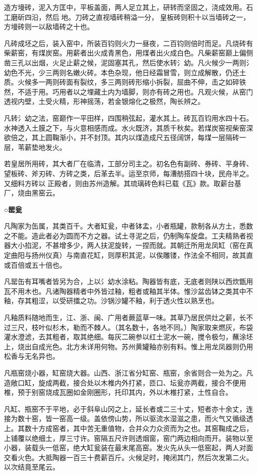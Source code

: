 \documentclass[]{article}
\begin{document}
造方墁砖，泥入方匡中，平板盖面，两人足立其上，研转而坚固之，浇成效用。石工磨斫四沿，然后地。刀砖之直视墙砖稍溢一分，皇板砖则积十以当墙砖之一，方墁砖则一以敌墙砖之十也。

凡砖成坯之后，装入窑中，所装百钧则火力一昼夜，二百钧则倍时而足。凡烧砖有柴薪窑，有煤炭窑。用薪者出火成青黑色，用煤者出火成白色。凡柴薪窑巅上偏侧凿三孔以出烟，火足止薪之候，泥固塞其孔，然后使水转氵幼。凡火候少一两则氵幼色不光，少三两则名嫩火砖。本色杂现，他日经霜冒雪，则立成解散，仍还土质。火候多一两则砖面有裂纹，多三两则砖形缩小拆裂，屈曲不伸，击之如碎铁然，不适于用。巧用者以之埋藏土内为墙脚，则亦有砖之用也。凡观火候，从窑门透视内壁，土受火精，形神摇荡，若金银熔化之极然，陶长辨之。

凡转氵幼之法，窑巅作一平田样，四围稍弦起，灌水其上。砖瓦百钧用水四十石。水神透入土膜之下，与火意相感而成。水火既济，其质千秋矣。若煤炭窑视柴窑深欲倍之，其上圆鞠渐小，并不封顶。其内以煤造成尺五径阔饼，每煤一层隔砖一层，苇薪垫地发火。

若皇居所用砖，其大者厂在临清，工部分司主之。初名色有副砖、券砖、平身砖、望板砖、斧刃砖、方砖之类，后革去半。运至京师，每漕舫搭四十块，民舟半之。又细料方砖以正殿者，则由苏州造解。其琉璃砖色料已载《瓦》款。取薪台基厂，烧由黑窑云。

\textbf{○罂瓮}

凡陶家为缶属，其类百千。大者缸瓮，中者钵孟，小者瓶罐，款制各从方土，悉数之不能。造此者必为圆而不方之器。试土寻泥之后，仍制陶车旋盘。工夫精熟者视器大小掐泥，不甚增多少，两人扶泥旋转，一捏而就。其朝迁所用龙凤缸（窑在真定曲阳与扬州仪真）与南直花缸，则厚积其泥，以俟雕镂，作法全不相同，故其直或百倍或五十倍也。

凡罂缶有耳嘴者皆另为合，上以氵幼水涂粘。陶器皆有底，无底者则陕以西炊甑用瓦不用木也。凡诸陶器精者中外皆过釉，粗者或釉其半体。惟沙盆齿钵之类其中不釉，存其粗涩，以受研擂之功。沙锅沙罐不釉，利于透火性以熟烹也。

凡釉质料随地而生，江、浙、闽、广用者蕨蓝草一味。其草乃居民供灶之薪，长不过三尺，枝叶似杉木，勒而不棘人。（其名数十，各地不同。）陶家取来燃灰，布袋灌水澄滤，去其粗者，取其绝细。每灰二碗参以红土泥水一碗，搅令极匀，蘸涂坯上，烧出自成光色。北方未详用何物。苏州黄罐釉亦别有料。惟上用龙凤器则仍用松香与无名异也。

凡瓶窑烧小器，缸窑烧大器。山西、浙江省分缸窑、瓶窑，余省则合一处为之。凡造敞口缸，旋成两截，接合处以木椎内外打紧，匝口、坛瓮亦两截，接合不便用椎，预于别窑烧成瓦圈如金刚圈形，托印其内，外以木椎打紧，土性自合。

凡缸、瓶窑不于平地，必于斜阜山冈之上，延长者或二三十丈，短者亦十余丈，连接为数十窑，皆一窑高一级。盖依傍山势，所以驱流水湿滋之患，而火气又循级透上。其数十方成窑者，其中苦无重值物，合并众力众资而为之也。其窑鞠成之后，上铺覆以绝细土，厚三寸许。窑隔五尺许则透烟窗，窑门两边相向而开。装物以至小器，装载头一低窑，绝大缸瓮装在最末尾高窑。发火先从头一低窑起，两人对面交看火色。大抵陶器一百三十费薪百斤。火候足时，掩闭其门，然后次发第二火。以次结竟至尾云。
\end{document}

